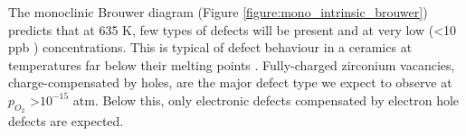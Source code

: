 The monoclinic Brouwer diagram (Figure \ref{figure:mono_intrinsic_brouwer}) predicts that at 635 K, few types of defects will be present and at very low (\textless 10 ppb \zirconia ) concentrations. This is typical of defect behaviour in a ceramics at temperatures far below their melting points \cite{kingery1997physical,ball2006computer}. Fully-charged zirconium vacancies, charge-compensated by holes, are the major defect type we expect to observe at $p_{O_{2}}$ \textgreater $10^{-15}$ atm. Below this, only electronic defects compensated by electron hole defects are expected. 


